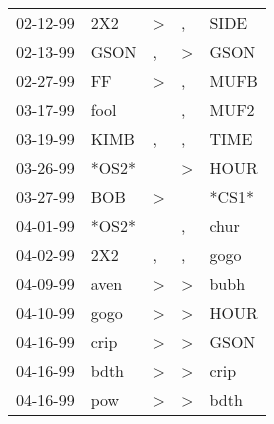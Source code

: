 \begin{supertabular}{p{0.07\textwidth}p{0.06\textwidth}p{0.02\textwidth}p{0.02\textwidth}p{0.06\textwidth}}
          02-12-99\textsuperscript{} &            2X2\textsuperscript{} &     \textgreater &                , &           SIDE\textsuperscript{} \\
          02-13-99\textsuperscript{} &           GSON\textsuperscript{} &                , &     \textgreater &           GSON\textsuperscript{} \\
          02-27-99\textsuperscript{} &             FF\textsuperscript{} &     \textgreater &                , &           MUFB\textsuperscript{} \\
          03-17-99\textsuperscript{} &           fool\textsuperscript{} &                  &                , &           MUF2\textsuperscript{} \\
          03-19-99\textsuperscript{} &           KIMB\textsuperscript{} &                , &                , &           TIME\textsuperscript{} \\
          03-26-99\textsuperscript{} &                            *OS2* &                  &     \textgreater &           HOUR\textsuperscript{} \\
          03-27-99\textsuperscript{} &            BOB\textsuperscript{} &     \textgreater &                  &                            *CS1* \\
          04-01-99\textsuperscript{} &                            *OS2* &                  &                , &           chur\textsuperscript{} \\
          04-02-99\textsuperscript{} &            2X2\textsuperscript{} &                , &                , &           gogo\textsuperscript{} \\
          04-09-99\textsuperscript{} &           aven\textsuperscript{} &     \textgreater &     \textgreater &           bubh\textsuperscript{} \\
          04-10-99\textsuperscript{} &           gogo\textsuperscript{} &     \textgreater &     \textgreater &           HOUR\textsuperscript{} \\
          04-16-99\textsuperscript{} &           crip\textsuperscript{} &     \textgreater &     \textgreater &           GSON\textsuperscript{} \\
          04-16-99\textsuperscript{} &           bdth\textsuperscript{} &     \textgreater &     \textgreater &           crip\textsuperscript{} \\
          04-16-99\textsuperscript{} &            pow\textsuperscript{} &     \textgreater &     \textgreater &           bdth\textsuperscript{} \\

\end{supertabular}
